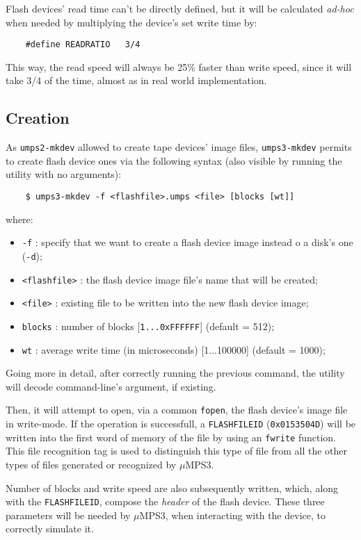 \documentclass[12pt,a4paper,openright,twoside]{report}
\begin{document}
	Flash devices' read time can't be directly defined, but it will be calculated \textit{ad-hoc} when needed by multiplying the device's set write time by: 
	\begin{verbatim}
	#define READRATIO   3/4
	\end{verbatim}
	This way, the read speed will always be 25\% faster than write speed, since it will take 3/4 of the time, almost as in real world implementation.
	
\subsection{Creation}
	As \texttt{umps2-mkdev} allowed to create tape devices' image files, \texttt{umps3-mkdev} permits to create flash device ones via the following syntax (also visible by running the utility with no arguments):
	\begin{verbatim}
	$ umps3-mkdev -f <flashfile>.umps <file> [blocks [wt]]
	\end{verbatim}
	where:
	\begin{itemize}
	\item	\texttt{-f} : specify that we want to create a flash device image instead o a disk's one (\texttt{-d});
	\item	\texttt{<flashfile>} : the flash device image file's name that will be created;
	\item	\texttt{<file>} : existing file to be written into the new flash device image;
	\item	\texttt{blocks} : number of blocks [\texttt{1...0xFFFFFF}] (default = 512);
	\item	\texttt{wt} : average write time (in microseconds) [1...100000] (default = 1000);
	\end{itemize}
	Going more in detail, after correctly running the previous command, the utility will decode command-line's argument, if existing.
	
	Then, it will attempt to open, via a common \texttt{fopen}, the flash device's image file in write-mode.
	If the operation is successfull, a \texttt{FLASHFILEID} (\texttt{0x0153504D}) will be written into the first word of memory of the file by using an \texttt{fwrite} function.
	This file recognition tag is used to distinguish this type of file from all the other types of files generated or recognized by $\mu$MPS3.
	
	Number of blocks and write speed are also subsequently written, which, along with the \texttt{FLASHFILEID}, compose the \textit{header} of the flash device.
	These three parameters will be needed by $\mu$MPS3, when interacting with the device, to correctly simulate it.
	
\end{document}
